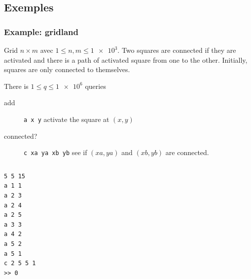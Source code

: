 \documentclass[10pt,svgnames,usenames,table]{beamer} %
\begin{document}
\subsection{Exemples}
\begin{frame}
  \frametitle{Example: gridland}
  Grid $n \times m$ avec $1 \leq n, m \leq \num{1e3}$.
  Two squares are connected if they are activated and there is a path of activated square from one to the other.
  Initially, squares are only connected to themselves.

  There is $1 \leq q \leq \num{1e6}$ queries
  \begin{description}
    \item[add] \verb|a x y| activate the square at $(x, y)$
    \item[connected?] \verb|c xa ya xb yb| see if $(xa, ya)$ and $(xb, yb)$ are connected.
  \end{description}
  \framebreak
  \begin{columns}
    \begin{column}{0.3\textwidth}
      \begin{verbatim}
5 5 15
a 1 1
a 2 3
a 2 4
a 2 5
a 3 3
a 4 2
a 5 2
a 5 1
c 2 5 5 1
>> 0
      \end{verbatim}
    \end{column}


\end{columns}
\end{frame}
\end{document}
